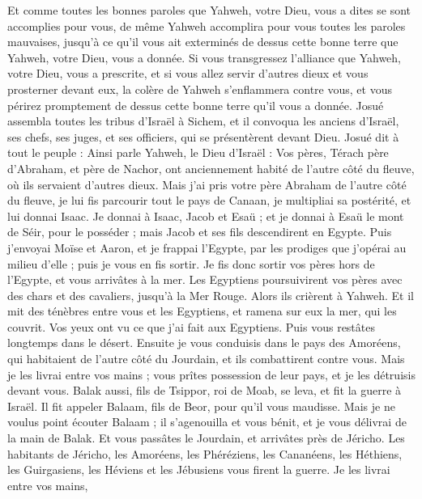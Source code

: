 \begin{multicols}{2}
Et comme toutes les bonnes paroles que Yahweh, votre Dieu, vous a dites se sont accomplies pour vous, de même Yahweh accomplira pour vous toutes les paroles mauvaises, jusqu’à ce qu’il vous ait exterminés de dessus cette bonne terre que Yahweh, votre Dieu, vous a donnée.
Si vous transgressez l’alliance que Yahweh, votre Dieu, vous a prescrite, et si vous allez servir d’autres dieux et vous prosterner devant eux, la colère de Yahweh s’enflammera contre vous, et vous périrez promptement de dessus cette bonne terre qu’il vous a donnée.
\VerseOne{}Josué assembla toutes les tribus d’Israël à Sichem, et il convoqua les anciens d’Israël, ses chefs, ses juges, et ses officiers, qui se présentèrent devant Dieu.
Josué dit à tout le peuple : Ainsi parle Yahweh, le Dieu d’Israël : Vos pères, Térach père d’Abraham, et père de Nachor, ont anciennement habité de l’autre côté du fleuve, où ils servaient d’autres dieux.
Mais j’ai pris votre père Abraham de l’autre côté du fleuve, je lui fis parcourir tout le pays de Canaan, je multipliai sa postérité, et lui donnai Isaac.
Je donnai à Isaac, Jacob et Esaü ; et je donnai à Esaü le mont de Séir, pour le posséder ; mais Jacob et ses fils descendirent en Egypte.
Puis j’envoyai Moïse et Aaron, et je frappai l’Egypte, par les prodiges que j’opérai au milieu d’elle ; puis je vous en fis sortir.
Je fis donc sortir vos pères hors de l’Egypte, et vous arrivâtes à la mer. Les Egyptiens poursuivirent vos pères avec des chars et des cavaliers, jusqu’à la Mer Rouge.
Alors ils crièrent à Yahweh. Et il mit des ténèbres entre vous et les Egyptiens, et ramena sur eux la mer, qui les couvrit. Vos yeux ont vu ce que j’ai fait aux Egyptiens. Puis vous restâtes longtemps dans le désert.
Ensuite je vous conduisis dans le pays des Amoréens, qui habitaient de l’autre côté du Jourdain, et ils combattirent contre vous. Mais je les livrai entre vos mains ; vous prîtes possession de leur pays, et je les détruisis devant vous.
Balak aussi, fils de Tsippor, roi de Moab, se leva, et fit la guerre à Israël. Il fit appeler Balaam, fils de Beor, pour qu’il vous maudisse.
Mais je ne voulus point écouter Balaam ; il s’agenouilla et vous bénit, et je vous délivrai de la main de Balak.
Et vous passâtes le Jourdain, et arrivâtes près de Jéricho. Les habitants de Jéricho, les Amoréens, les Phéréziens, les Cananéens, les Héthiens, les Guirgasiens, les Héviens et les Jébusiens vous firent la guerre. Je les livrai entre vos mains,

\end{multicols}
